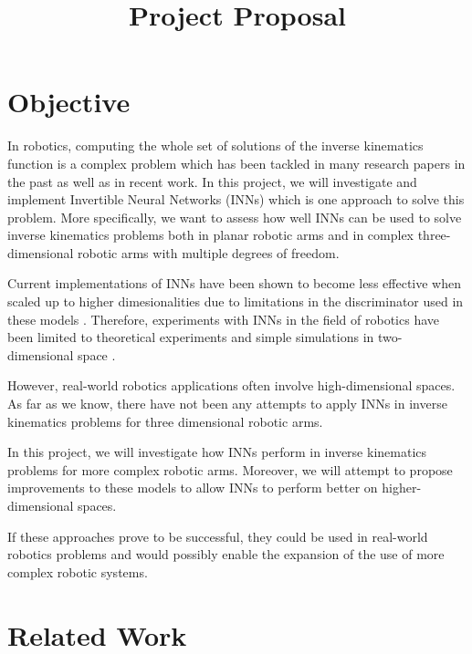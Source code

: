 \documentclass[conference]{IEEEtran}
\begin{document}
\nocite{*}

\title{Project Proposal}

\author{
    \and
}

\maketitle

\section*{Objective}

In robotics, computing the whole set of solutions of the inverse kinematics function is a complex problem which has been tackled in many research papers in the past as well as in recent work. In this project, we will investigate and implement Invertible Neural Networks (INNs) \cite{Ardizzone2018} which is one approach to solve this problem. More specifically, we want to assess how well INNs can be used to solve inverse kinematics problems
both in planar robotic arms and in complex three-dimensional robotic arms with multiple degrees of freedom.


Current implementations of INNs have been shown to become less effective when scaled up to higher dimesionalities
due to limitations in the discriminator used in these models \cite{Ardizzone2018}.
Therefore, experiments with INNs in the field of robotics have been limited to theoretical experiments
and simple simulations in two-dimensional space \cite{Ardizzone2018,Kruse2019}.

However, real-world robotics applications often involve high-dimensional spaces. As far as we know,
there have not been any attempts to apply INNs in inverse kinematics problems for three dimensional robotic arms.

In this project, we will investigate how INNs perform in inverse kinematics problems for more complex robotic arms.
Moreover, we will attempt to propose improvements to these models to allow INNs to perform better on higher-dimensional spaces.

If these approaches prove to be successful, they could be used in real-world robotics problems
and would possibly enable the expansion of the use of more complex robotic systems.

\section*{Related Work}
\end{document}
